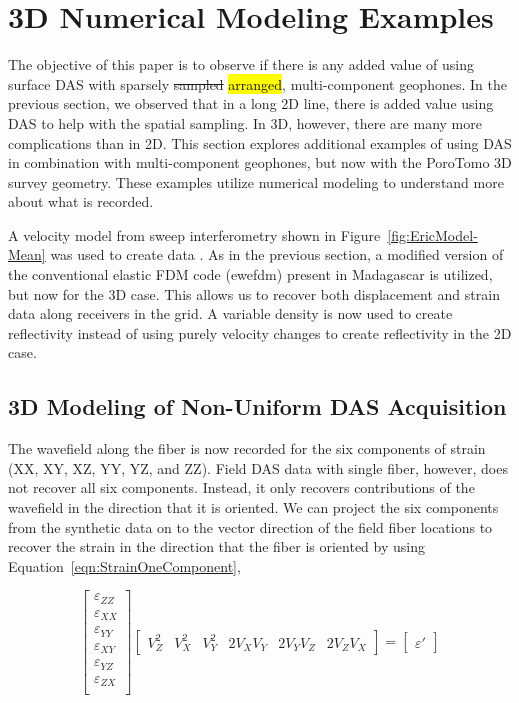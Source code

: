\section{3D Numerical Modeling Examples}
The objective of this paper is to observe if there is any added value of using surface DAS with sparsely \sout{sampled} \hl{arranged}, multi-component geophones. In the previous section, we observed that in a long 2D line, there is added value using DAS to help with the spatial sampling. In 3D, however, there are many more complications than in 2D. This section explores additional examples of using DAS in combination with multi-component geophones, but now with the PoroTomo 3D survey geometry. These examples utilize numerical modeling to understand more about what is recorded.

A velocity model from sweep interferometry shown in Figure~\ref{fig:EricModel-Mean} was used to create data \citep{matzelseismic}. As in the previous section, a modified version of the conventional elastic FDM code (ewefdm) present in Madagascar \citep{fomel2013madagascar} is utilized, but now for the 3D case. This allows us to recover both displacement and strain data along receivers in the grid. A variable density is now used to create reflectivity instead of using purely velocity changes to create reflectivity in the 2D case.



\subsection{3D Modeling of Non-Uniform DAS Acquisition}
The wavefield along the fiber is now recorded for the six components of strain (XX, XY, XZ, YY, YZ, and ZZ). Field DAS data with single fiber, however, does not recover all six components. Instead, it only recovers contributions of the wavefield in the direction that it is oriented. We can project the six components from the synthetic data on to the vector direction of the field fiber locations to recover the strain in the direction that the fiber is oriented by using Equation~\ref{eqn:StrainOneComponent},

\begin{equation}
\begin{bmatrix}
  \varepsilon_{ZZ} \\
  \varepsilon_{XX} \\
  \varepsilon_{YY} \\
  \varepsilon_{XY} \\
  \varepsilon_{YZ} \\
  \varepsilon_{ZX} \\
\end{bmatrix}
\begin{bmatrix}
  V_Z^2 & V_X^2 & V_Y^2 & 2V_XV_Y & 2V_YV_Z & 2V_ZV_X
\end{bmatrix}
=
\begin{bmatrix}
  \varepsilon'
\end{bmatrix}
\label{eqn:StrainOneComponent}
\end{equation}

